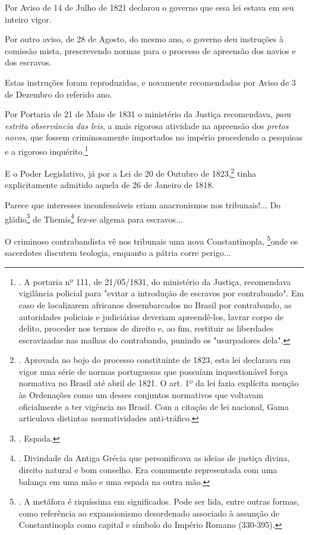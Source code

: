 Por Aviso de 14 de Julho de 1821 declarou o governo que essa lei estava
em seu inteiro vigor.

Por outro aviso, de 28 de Agosto, do mesmo ano, o governo deu instruções
à comissão mista, prescrevendo normas para o processo de apreensão dos
navios e dos escravos.

Estas instruções foram reproduzidas, e novamente recomendadas por Aviso
de 3 de Dezembro do referido ano.

Por Portaria de 21 de Maio de 1831 o ministério da Justiça recomendava,
\emph{para estrita observância das leis}, a mais rigorosa atividade na
apreensão dos \emph{pretos novos}, que fossem criminosamente importados
no império procedendo a pesquisas e a rigoroso inquérito.\footnote{. A
  portaria nº 111, de 21/05/1831, do ministério da Justiça, recomendava
  vigilância policial para "evitar a introdução de escravos por
  contrabando". Em caso de localizarem africanos desembarcados no Brasil
  por contrabando, as autoridades policiais e judiciárias deveriam
  apreendê-los, lavrar corpo de delito, proceder nos termos de direito
  e, ao fim, restituir as liberdades escravizadas nas malhas do
  contrabando, punindo os "usurpadores dela".}

E o Poder Legislativo, já por a Lei de 20 de Outubro de 1823,\footnote{.
  Aprovada no bojo do processo constituinte de 1823, esta lei declarava
  em vigor uma série de normas portuguesas que possuíam inquestionável
  força normativa no Brasil até abril de 1821. O art. 1º da lei fazia
  explícita menção às Ordenações como um desses conjuntos normativos que
  voltavam oficialmente a ter vigência no Brasil. Com a citação de lei
  nacional, Gama articulava distintas normatividades anti-tráfico.}
tinha explicitamente admitido aquela de 26 de Janeiro de 1818.

Parece que interesses inconfessáveis criam anacronismos nos
tribunais!... Do gládio\footnote{. Espada.} de Themis\footnote{.
  Divindade da Antiga Grécia que personificava as ideias de justiça
  divina, direito natural e bom conselho. Era comumente representada com
  uma balança em uma mão e uma espada na outra mão.} fez-se algema para
escravos...

O criminoso contrabandista vê nos tribunais uma nova Constantinopla,
\footnote{. A metáfora é riquíssima em significados. Pode ser lida,
  entre outras formas, como referência ao expansionismo desordenado
  associado à assunção de Constantinopla como capital e símbolo do
  Império Romano (330-395).}onde os sacerdotes discutem teologia,
enquanto a pátria corre perigo...

